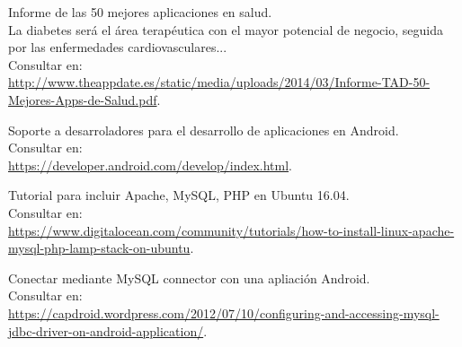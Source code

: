 \documentclass[11pt,spanish,
		listoftables,listoffigures]
		{tfgplantilla}
\begin{document}
\begin{thebibliography}{10}




   Informe de las 50 mejores aplicaciones en salud.\\
   \guillemotleft La diabetes será el área terapéutica con el mayor potencial de negocio, seguida por las enfermedades cardiovasculares... \guillemotright\\
   \newblock Consultar en:\\
   \url{ http://www.theappdate.es/static/media/uploads/2014/03/Informe-TAD-50-Mejores-Apps-de-Salud.pdf}.

   Soporte a desarroladores para el desarrollo de aplicaciones en Android.\\
   \newblock Consultar en:\\
   \url{https://developer.android.com/develop/index.html}.

   Tutorial para incluir Apache, MySQL, PHP en Ubuntu 16.04.\\
   \newblock Consultar en:\\
   \url{https://www.digitalocean.com/community/tutorials/how-to-install-linux-apache-mysql-php-lamp-stack-on-ubuntu}.

   Conectar mediante MySQL connector con una apliación Android.\\
   \newblock Consultar en:\\
   \url{ https://capdroid.wordpress.com/2012/07/10/configuring-and-accessing-mysql-jdbc-driver-on-android-application/}.


\end{thebibliography}
\end{document}

